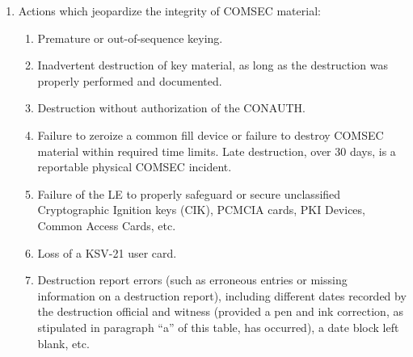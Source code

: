 \documentclass{article}
\begin{document}
\begin{enumerate}
\begin{enumerate}
\begin{enumerate}
\item	Actions which jeopardize the integrity of COMSEC material: 
\begin{enumerate}
    \item 	Premature or out-of-sequence keying.
\item	Inadvertent destruction of key material, as long as the destruction was properly performed and documented. 
\item	Destruction without authorization of the CONAUTH. 
\item	Failure to zeroize a common fill device or failure to destroy COMSEC material within required time limits.  Late destruction, over 30 days, is a reportable physical COMSEC incident. 
\item	Failure of the LE to properly safeguard or secure unclassified Cryptographic Ignition keys (CIK), PCMCIA cards, PKI Devices, Common Access Cards, etc. 
\item Loss of a KSV-21 user card.  
\item Destruction report errors (such as erroneous entries or missing information on a destruction report), including different dates recorded by the destruction official and witness (provided a pen and ink correction, as stipulated in paragraph “a” of this table, has occurred), a date block left blank, etc.
\end{enumerate}
\end{enumerate}


\end{enumerate}
\end{enumerate}
\end{document}
